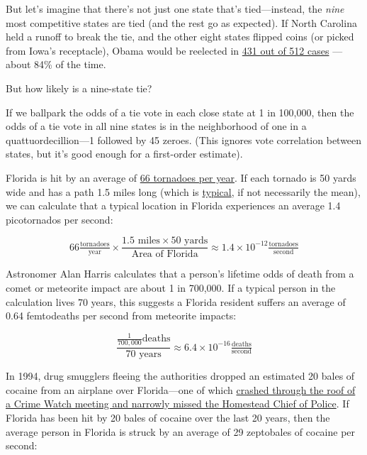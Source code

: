 {But let’s imagine that there’s not just one state that’s tied—instead, the \emph{nine} most competitive states are tied (and the rest go as expected). If North Carolina held a runoff to break the tie, and the other eight states flipped coins (or picked from Iowa’s receptacle), Obama would be reelected in \href{http://www.nytimes.com/interactive/2012/11/02/us/politics/paths-to-the-white-house.html}{431 out of 512 cases} —about 84\% of the time.}

{But how likely is a nine-state tie?}

{If we ballpark the odds of a tie vote in each close state at 1 in 100,000, then the odds of a tie vote in all nine states is in the neighborhood of one in a quattuordecillion—1 followed by 45 zeroes. (This ignores vote correlation between states, but it’s good enough for a first-order estimate).}

{Florida is hit by an average of \href{http://www1.ncdc.noaa.gov/pub/data/cmb/images/tornado/clim/ann-avg-torn1991-2010.gif}{66 tornadoes per year}. If each tornado is 50 yards wide and has a path 1.5 miles long (which is \href{http://www.crh.noaa.gov/lmk/soo/docu/tornado\_faq.php} {typical}, if not necessarily the mean), we can calculate that a typical location in Florida experiences an average 1.4 picotornados per second:}

{\[66\tfrac{\text{tornadoes}}{\text{year}}\times\frac{1.5\text{ miles}\times50\text{ yards}}{\text{Area of Florida}}\approx1.4\times10^{-12}\tfrac{\text{tornadoes}}{\text{second}}\]}

{Astronomer Alan Harris calculates that a person’s lifetime odds of death from a comet or meteorite impact are about 1 in 700,000. If a typical person in the calculation lives 70 years, this suggests a Florida resident suffers an average of 0.64 femtodeaths per second from meteorite impacts:}

{\[\frac{\tfrac{1}{700,000}\text{deaths}}{70\text{ years}}\approx6.4\times10^{-16}\tfrac{\text{deaths}}{\text{second}}\]}

{In 1994, drug smugglers fleeing the authorities dropped an estimated 20 bales of cocaine from an airplane over Florida—one of which \href{http://www.deseretnews.com/article/392575/ONLY-IN-FLORIDA-DOES-COCAINE-DROP-FROM-SKY.html?pg=all}{crashed through the roof of a Crime Watch meeting and narrowly missed the Homestead Chief of Police}. If Florida has been hit by 20 bales of cocaine over the last 20 years, then the average person in Florida is struck by an average of 29 zeptobales of cocaine per second:}

